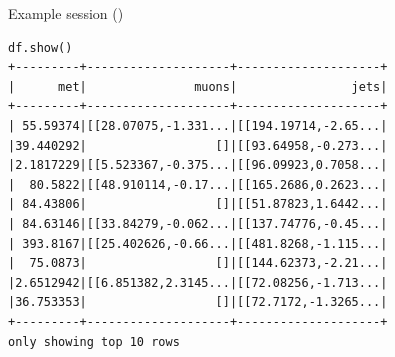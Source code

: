 \documentclass{beamer}
\begin{document}
\begin{frame}[fragile]{Example session ()}
\small
\begin{verbatim}
df.show()
+---------+--------------------+--------------------+
|      met|               muons|                jets|
+---------+--------------------+--------------------+
| 55.59374|[[28.07075,-1.331...|[[194.19714,-2.65...|
|39.440292|                  []|[[93.64958,-0.273...|
|2.1817229|[[5.523367,-0.375...|[[96.09923,0.7058...|
|  80.5822|[[48.910114,-0.17...|[[165.2686,0.2623...|
| 84.43806|                  []|[[51.87823,1.6442...|
| 84.63146|[[33.84279,-0.062...|[[137.74776,-0.45...|
| 393.8167|[[25.402626,-0.66...|[[481.8268,-1.115...|
|  75.0873|                  []|[[144.62373,-2.21...|
|2.6512942|[[6.851382,2.3145...|[[72.08256,-1.713...|
|36.753353|                  []|[[72.7172,-1.3265...|
+---------+--------------------+--------------------+
only showing top 10 rows
\end{verbatim}
\end{frame}








\end{document}
